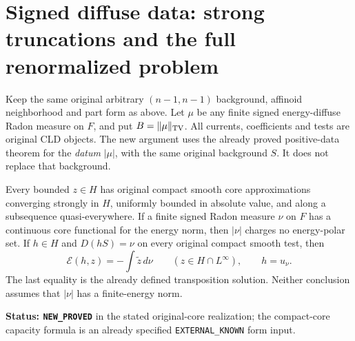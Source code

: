 \section{Signed diffuse data: strong truncations and the full renormalized problem}
\label{sec:r11-signed-diffuse-renormalized}

Keep the same original arbitrary $(n-1,n-1)$ background, affinoid
neighborhood and part form as above.  Let $\mu$ be any finite
signed energy-diffuse Radon measure on $F$, and put
$B=\|\mu\|_{\rm TV}$.  All currents, coefficients and tests are
original CLD objects.  The new argument uses the already proved
positive-data theorem for the \emph{datum} $|\mu|$, with the same
original background $S$.  It does not replace that background.

\begin{lemma}
\label{lem:r11-bounded-H-tests-diffuse}
Every bounded $z\in H$ has original compact smooth core
approximations converging strongly in $H$, uniformly bounded
in absolute value, and along a subsequence quasi-everywhere.
If a finite signed Radon measure $\nu$ on $F$ has a continuous
core functional for the energy norm, then $|\nu|$ charges no
energy-polar set.  If $h\in H$ and $D(hS)=\nu$ on every original
compact smooth test, then
\[
       \mathcal E(h,z)=-\int\widetilde z\,d\nu
                     \qquad(z\in H\cap L^\infty),
       \qquad h=u_\nu .
 \tag{SD1}
\]
The last equality is the already defined transposition solution.
Neither conclusion assumes that $|\nu|$ has a finite-energy norm.
\end{lemma}

\noindent\textbf{Status: \texttt{NEW\_PROVED}} in the stated
original-core realization; the compact-core capacity formula is
an already specified \texttt{EXTERNAL\_KNOWN} form input.

